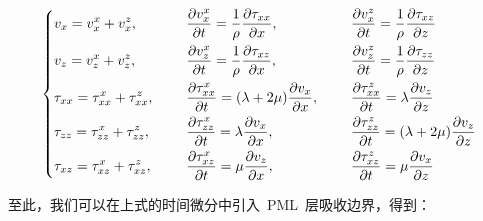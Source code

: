 \documentclass[UTF8]{ctexart}
\begin{document}
\begin{equation}
\left\{ \begin{aligned}
& v_x=v_x^x+v_x^z, & \hspace{5mm} & \frac{\partial v_x^x}{\partial t}=\frac{1}{\rho}\frac{\partial \tau_{xx}}{\partial x}, & \hspace{5mm} & \frac{\partial v_x^z}{\partial t}=\frac{1}{\rho}\frac{\partial \tau_{xz}}{\partial z} \\
& v_z=v_z^x+v_z^z, & \hspace{5mm} & \frac{\partial v_z^x}{\partial t}=\frac{1}{\rho}\frac{\partial \tau_{xz}}{\partial x}, & \hspace{5mm} & \frac{\partial v_z^z}{\partial t}=\frac{1}{\rho}\frac{\partial \tau_{zz}}{\partial z} \\
& \tau_{xx}=\tau_{xx}^x+\tau_{xx}^z, & \hspace{5mm} & \frac{\partial \tau_{xx}^x}{\partial t}=(\lambda+2\mu)\frac{\partial v_x}{\partial x}, & \hspace{5mm} & \frac{\partial \tau_{xx}^z}{\partial t}=\lambda\frac{\partial v_z}{\partial z} \\
& \tau_{zz}=\tau_{zz}^x+\tau_{zz}^z, & \hspace{5mm} & \frac{\partial \tau_{zz}^x}{\partial t}=\lambda\frac{\partial v_x}{\partial x}, & \hspace{5mm} & \frac{\partial \tau_{zz}^z}{\partial t}=(\lambda+2\mu)\frac{\partial v_z}{\partial z} \\
& \tau_{xz}=\tau_{xz}^x+\tau_{xz}^z, & \hspace{5mm} & \frac{\partial \tau_{xz}^x}{\partial t}=\mu\frac{\partial v_z}{\partial x}, & \hspace{5mm} & \frac{\partial \tau_{xz}^z}{\partial t}=\mu\frac{\partial v_x}{\partial z}
\end{aligned} \right.
\end{equation}\par
至此，我们可以在上式的时间微分中引入~PML~层吸收边界，得到：
\end{document}
